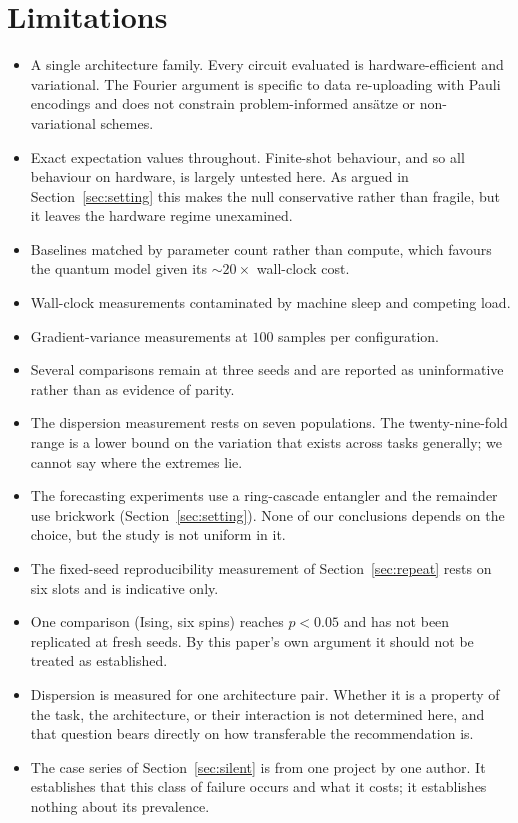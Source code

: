 \documentclass[11pt,onecolumn]{article}
\newif\ifdraft
\newcommand{\pend}[1]{%
  \ifdraft\textcolor{PendFG}{\textbf{[}\textit{#1}\textbf{]}}\fi}
\begin{document}
\section{Limitations}
\begin{itemize}\itemsep3pt
\item A single architecture family. Every circuit evaluated is
      hardware-efficient and variational. The Fourier argument is
      specific to data re-uploading with Pauli encodings and does not
      constrain problem-informed ans\"atze or non-variational schemes.
\item Exact expectation values throughout. Finite-shot behaviour, and so
      all behaviour on hardware, is largely untested here. As argued in
      Section~\ref{sec:setting} this makes the null conservative rather
      than fragile, but it leaves the hardware regime unexamined.
      \pend{the shot-noise probe exists; either run it or remove the
      claim}
\item Baselines matched by parameter count rather than compute, which
      favours the quantum model given its $\sim\!20\times$ wall-clock
      cost.
\item Wall-clock measurements contaminated by machine sleep and
      competing load.
\item Gradient-variance measurements at $100$ samples per configuration.
\item Several comparisons remain at three seeds and are reported as
      uninformative rather than as evidence of parity.
\item The dispersion measurement rests on seven populations. The
      twenty-nine-fold range is a lower bound on the variation that
      exists across tasks generally; we cannot say where the extremes
      lie.
\item The forecasting experiments use a ring-cascade entangler and the
      remainder use brickwork (Section~\ref{sec:setting}). None of our
      conclusions depends on the choice, but the study is not uniform
      in it.
\item The fixed-seed reproducibility measurement of
      Section~\ref{sec:repeat} rests on six slots and is indicative
      only.
\item One comparison (Ising, six spins) reaches $p < 0.05$ and has not
      been replicated at fresh seeds. By this paper's own argument it
      should not be treated as established.
\item Dispersion is measured for one architecture pair. Whether it is a
      property of the task, the architecture, or their interaction is
      not determined here, and that question bears directly on how
      transferable the recommendation is.
\item The case series of Section~\ref{sec:silent} is from one project by
      one author. It establishes that this class of failure occurs and
      what it costs; it establishes nothing about its prevalence.
\end{itemize}
\end{document}
